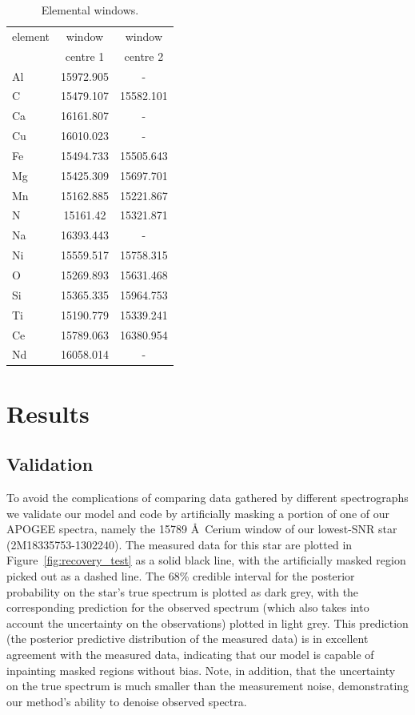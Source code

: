 \documentclass[a4paper,fleqn,usenatbib]{mnras}
\begin{document}
\begin{table}
    \centering
    \caption{Elemental windows.}
    \label{tab:window_centres}
    \begin{tabular}{lcc}
        \hline
        element & window & window \\
         & centre 1 & centre 2 \\
        \hline
        Al & 15972.905 & - \\
        C & 15479.107 & 15582.101 \\
        Ca & 16161.807 & - \\
        Cu & 16010.023 & - \\
        Fe & 15494.733 & 15505.643 \\
        Mg & 15425.309 & 15697.701 \\
        Mn & 15162.885 & 15221.867 \\
        N & 15161.42 & 15321.871 \\
        Na & 16393.443 & - \\
        Ni & 15559.517 & 15758.315 \\
        O & 15269.893 & 15631.468 \\
        Si & 15365.335 & 15964.753 \\
        Ti & 15190.779 & 15339.241 \\
        Ce & 15789.063 & 16380.954 \\
        Nd & 16058.014 & - \\
        \hline
    \end{tabular}
\end{table}


\section{Results}

\subsection{Validation}

To avoid the complications of comparing data gathered by different spectrographs we validate our model and code by artificially masking a portion of one of our APOGEE spectra, namely the 15789 \AA\ Cerium window of our lowest-SNR star (2M18335753-1302240). The measured data for this star are plotted in Figure~\ref{fig:recovery_test} as a solid black line, with the artificially masked region picked out as a dashed line. The 68\% credible interval for the posterior probability on the star's true spectrum is plotted as dark grey, with the corresponding prediction for the observed spectrum (which also takes into account the uncertainty on the observations) plotted in light grey. This prediction (the posterior predictive distribution of the measured data) is in excellent agreement with the measured data, indicating that our model is capable of inpainting masked regions without bias. Note, in addition, that the uncertainty on the true spectrum is much smaller than the measurement noise, demonstrating our method's ability to denoise observed spectra.
\end{document}
